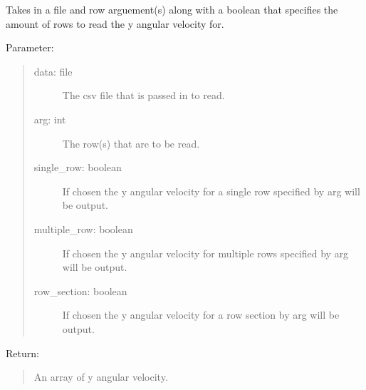 \documentclass[letterpaper,10pt,english]{sphinxmanual}
\begin{document}
\begin{fulllineitems}
\label{\detokenize{Lidar extraction tool:imu_extract.get_y_ang_vel}}
Takes in a file and row arguement(s) along with a boolean that specifies the amount of rows to read the y angular velocity for.

Parameter:
\begin{quote}
\begin{description}
\item[{data: file}] \leavevmode
The csv file that is passed in to read.

\item[{arg: int}] \leavevmode
The row(s) that are to be read.

\item[{single\_row: boolean}] \leavevmode
If chosen the y angular velocity for a single row specified by arg will be output.

\item[{multiple\_row: boolean}] \leavevmode
If chosen the y angular velocity for multiple rows specified by arg will be output.

\item[{row\_section: boolean}] \leavevmode
If chosen the y angular velocity for a row section by arg will be output.

\end{description}
\end{quote}

Return:
\begin{quote}

An array of y angular velocity.
\end{quote}

\end{fulllineitems}

\end{document}
